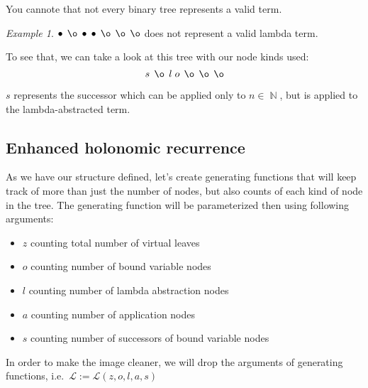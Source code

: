\documentclass[final]{article}
\theoremstyle{definition}
\theoremstyle{remark}
\newtheorem{example}{Example}[subsection]
\newcommand{\gf}[1]{\ensuremath{\mathcal{#1}}}
\DeclareMathOperator{\N}{\mathbb{N}}
\DeclareMathOperator{\n}{\bullet}
\DeclareMathOperator{\no}{\o}
\begin{document}
You cannote that not every binary tree represents a valid term.

\begin{example}
    \(\n\; \no\; \n\; \n\; \no\; \no\; \no\) does not represent a valid lambda term.
\end{example}

To see that, we can take a look at this tree with our node kinds used:
    \[s\; \no\; l\; o\; \no\; \no\; \no\]

\(s\) represents the successor which can be applied only to \(n \in \N\), but is applied to the lambda-abstracted term.

\subsection{Enhanced holonomic recurrence}%
\label{sub:enhanced_holonomic_reccurence}

As we have our structure defined, let's create generating functions that will keep track of more than just the number of nodes, but also counts of each kind of node in the tree. The generating function will be parameterized then using following arguments:
\begin{itemize}
    \item \(z\) counting total number of virtual leaves
    \item \(o\) counting number of bound variable nodes
    \item \(l\) counting number of lambda abstraction nodes
    \item \(a\) counting number of application nodes
    \item \(s\) counting number of successors of bound variable nodes
\end{itemize}

In order to make the image cleaner, we will drop the arguments of generating functions, i.e.\ \(\gf{L} := \gf{L}(z, o, l, a, s)\)
\end{document}
